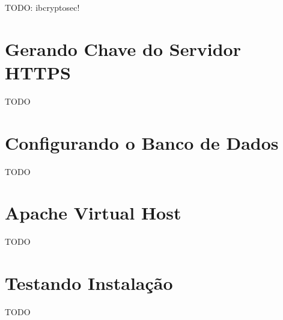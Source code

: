 TODO: ibcryptosec!


\section{Gerando Chave do Servidor HTTPS}

TODO


\section{Configurando o Banco de Dados}

TODO


\section{Apache Virtual Host}

TODO


\section{Testando Instalação}

TODO